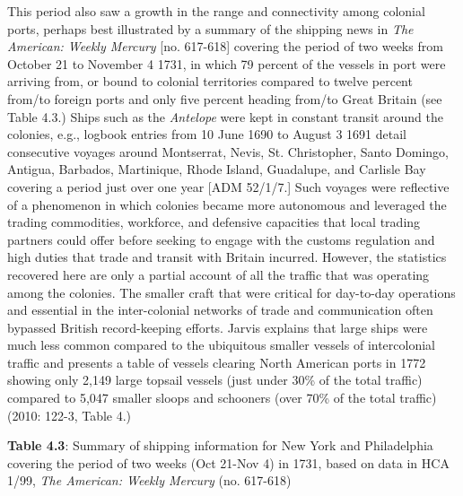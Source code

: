 \begin{styleStandard}
This period also saw a growth in the range and connectivity among colonial ports, perhaps best illustrated by a summary of the shipping news in \textit{The American: Weekly Mercury} [no. 617-618] covering the period of two weeks from October 21 to November 4 1731, in which 79 percent of the vessels in port were arriving from, or bound to colonial territories compared to twelve percent from/to foreign ports and only five percent heading from/to Great Britain (see Table 4.3.) Ships such as the \textit{Antelope} were kept in constant transit around the colonies, e.g., logbook entries from 10 June 1690 to August 3 1691 detail consecutive voyages around Montserrat, Nevis, St. Christopher, Santo Domingo, Antigua, Barbados, Martinique, Rhode Island, Guadalupe, and Carlisle Bay covering a period just over one year [ADM 52/1/7.] Such voyages were reflective of a phenomenon in which colonies became more autonomous and leveraged the trading commodities, workforce, and defensive capacities that local trading partners could offer before seeking to engage with the customs regulation and high duties that trade and transit with Britain incurred. However, the statistics recovered here are only a partial account of all the traffic that was operating among the colonies. The smaller craft that were critical for day-to-day operations and essential in the inter-colonial networks of trade and communication often bypassed British record-keeping efforts. Jarvis explains that large ships were much less common compared to the ubiquitous smaller vessels of intercolonial traffic and presents a table of vessels clearing North American ports in 1772 showing only 2,149 large topsail vessels (just under 30\% of the total traffic) compared to 5,047 smaller sloops and schooners (over 70\% of the total traffic) (2010: 122-3, Table 4.) 
\end{styleStandard}


\begin{styleStandard}
\textbf{Table 4.3}: Summary of shipping information for New York and Philadelphia covering the period of two weeks (Oct 21-Nov 4) in 1731, based on data in HCA 1/99, \textit{The American: Weekly Mercury} (no. 617-618) 
\end{styleStandard}


\begin{styleStandard}
  [Warning: Image ignored] %
 
\end{styleStandard}



